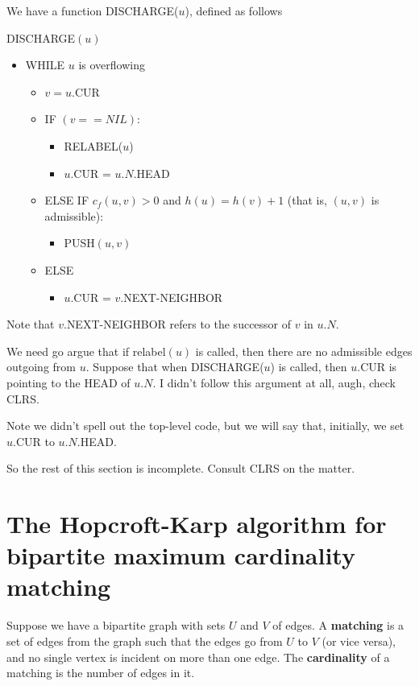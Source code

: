 \documentclass{article}
\begin{document}
We have a function DISCHARGE($u$), defined as follows

DISCHARGE$(u)$
\begin{itemize}
	\item
	WHILE $u$ is overflowing
		\begin{itemize}
			\item
			$v = u.$CUR
			
			\item
			IF $(v == NIL)$:
				\begin{itemize}
					\item
					RELABEL($u$)
					
					\item
					$u.$CUR = $u.N.$HEAD
				\end{itemize}
			
			\item
			ELSE IF $c_f(u,v) > 0$ and $h(u) = h(v) + 1$ (that is, $(u,v)$
			is admissible):
				\begin{itemize}	
					\item
					PUSH$(u,v)$
				\end{itemize}
			\item
			ELSE
				\begin{itemize}
					\item
					$u.$CUR = $v.$NEXT-NEIGHBOR
				\end{itemize}
		\end{itemize}
\end{itemize}
Note that $v.$NEXT-NEIGHBOR refers to the successor of $v$ in $u.N$.

We need go argue that if relabel$(u)$ is called, then there are no
admissible edges outgoing from $u$.
Suppose that when DISCHARGE($u$) is called, then $u.$CUR is pointing
to the HEAD of $u.N$.
I didn't follow this argument at all, augh, check CLRS.

Note we didn't spell out the top-level code, but we will say that, initially,
we set $u.$CUR to $u.N.$HEAD.

So the rest of this section is incomplete. Consult CLRS on the matter.


\section{The Hopcroft-Karp algorithm for bipartite maximum cardinality matching}

Suppose we have a bipartite graph with sets $U$ and $V$ of edges.
A \textbf{matching} is a set of edges from the graph such that the edges
go from $U$ to $V$ (or vice versa), and no single vertex is incident on more 
than one edge.
The \textbf{cardinality} of a matching is the number of edges in it.
\end{document}
